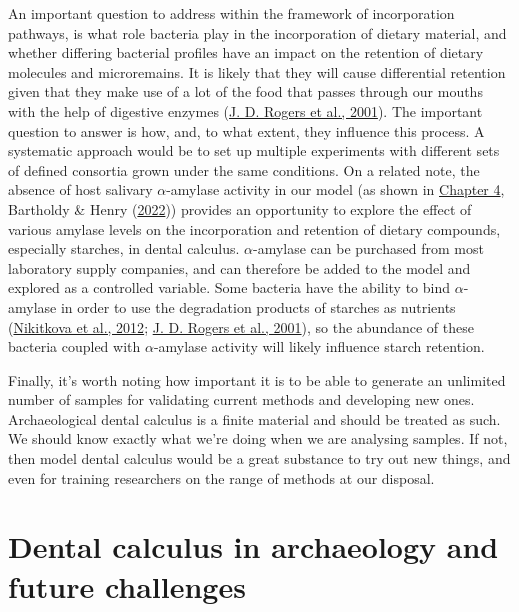\documentclass[
  letterpaper,
]{book}
\begin{document}
An important question to address within the framework of incorporation
pathways, is what role bacteria play in the incorporation of dietary
material, and whether differing bacterial profiles have an impact on the
retention of dietary molecules and microremains. It is likely that they
will cause differential retention given that they make use of a lot of
the food that passes through our mouths with the help of digestive
enzymes (\protect\hyperlink{ref-rogersRoleStreptococcus2001}{J. D.
Rogers et al., 2001}). The important question to answer is how, and, to
what extent, they influence this process. A systematic approach would be
to set up multiple experiments with different sets of defined consortia
grown under the same conditions. On a related note, the absence of host
salivary \(\alpha\)-amylase activity in our model (as shown in
\protect\hyperlink{byoc-starch}{Chapter 4}, Bartholdy \& Henry
(\protect\hyperlink{ref-bartholdyInvestigatingBiases2022}{2022}))
provides an opportunity to explore the effect of various amylase levels
on the incorporation and retention of dietary compounds, especially
starches, in dental calculus. \(\alpha\)-amylase can be purchased from
most laboratory supply companies, and can therefore be added to the
model and explored as a controlled variable. Some bacteria have the
ability to bind \(\alpha\)-amylase in order to use the degradation
products of starches as nutrients
(\protect\hyperlink{ref-nikitkovaEffectStarch2012}{Nikitkova et al.,
2012}; \protect\hyperlink{ref-rogersRoleStreptococcus2001}{J. D. Rogers
et al., 2001}), so the abundance of these bacteria coupled with
\(\alpha\)-amylase activity will likely influence starch retention.

Finally, it's worth noting how important it is to be able to generate an
unlimited number of samples for validating current methods and
developing new ones. Archaeological dental calculus is a finite material
and should be treated as such. We should know exactly what we're doing
when we are analysing samples. If not, then model dental calculus would
be a great substance to try out new things, and even for training
researchers on the range of methods at our disposal.

\hypertarget{dental-calculus-in-archaeology-and-future-challenges}{%
\section{Dental calculus in archaeology and future
challenges}\label{dental-calculus-in-archaeology-and-future-challenges}}
\end{document}

